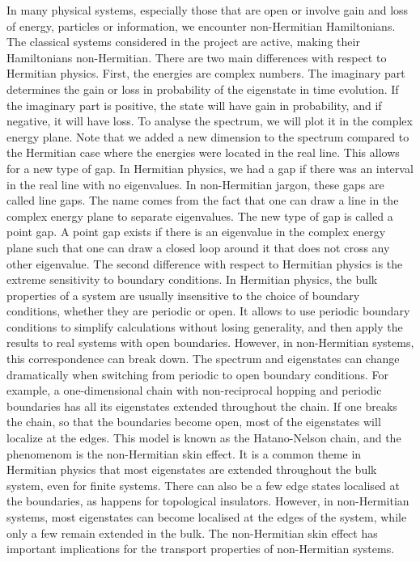 \documentclass[11pt, a4paper]{article} %
\begin{document}
In many physical systems, especially those that are open or involve gain and loss of energy, particles or information, 
we encounter non-Hermitian Hamiltonians. The classical systems considered in the project are active, making their 
Hamiltonians non-Hermitian. There are two main 
differences with respect to Hermitian physics. First, the energies are complex numbers. The imaginary part determines the gain or loss in 
probability of the eigenstate in time evolution. If the imaginary part is positive, the state will have gain in probability, and if negative, it will have loss.
To analyse the spectrum, we will plot it in the complex energy plane. Note that we added a new dimension to the spectrum compared to the Hermitian case 
where the energies were located in the real line. This allows for a new type of gap. 
In Hermitian physics, we had a gap if there was an interval in the real line with no eigenvalues. In non-Hermitian jargon, these gaps are called line gaps. 
The name comes from the fact that one can draw a line in the complex energy plane to separate eigenvalues. The new type of gap is called a point gap.
A point gap exists if there is an eigenvalue in the complex energy plane such that one can draw a closed loop around it that does not cross any other eigenvalue.
The second difference with respect to Hermitian physics is the extreme sensitivity to boundary conditions. 
In Hermitian physics, the bulk properties of a system are usually insensitive to the choice of boundary conditions, whether they are periodic or open. 
It allows to use periodic boundary conditions to simplify calculations without losing generality, and then apply the results to real systems with open boundaries.
However, in non-Hermitian systems, this correspondence can break down. 
The spectrum and eigenstates can change dramatically when switching from periodic to open boundary conditions.
For example, a one-dimensional chain with non-reciprocal hopping and periodic boundaries has all its eigenstates extended throughout the chain. 
If one breaks the chain, so that the boundaries become open, most of the eigenstates will localize at the edges. This model is known as the Hatano-Nelson chain, 
and the phenomenom is the non-Hermitian skin effect. It is a common theme in Hermitian physics that most eigenstates 
are extended throughout the bulk system, even for finite systems. 
There can also be a few edge states localised at the boundaries, as happens for topological insulators. However, in non-Hermitian systems, 
most eigenstates can become localised at the edges of the system, while only a few remain extended in the bulk. 
The non-Hermitian skin effect has important implications for the transport properties of non-Hermitian systems.
\end{document}
